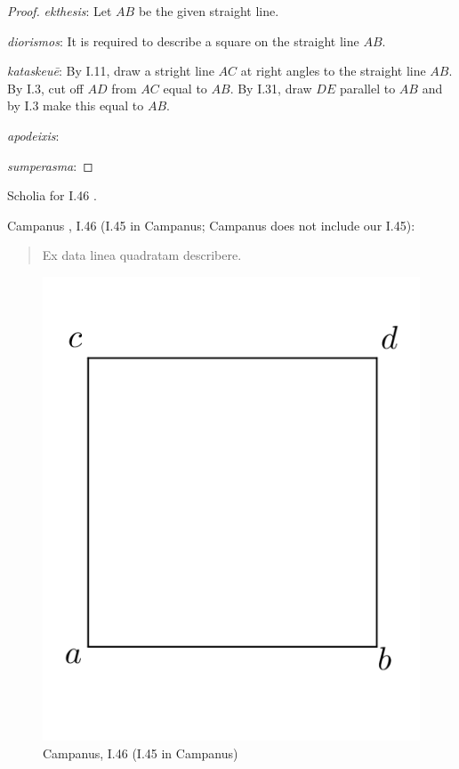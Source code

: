 \documentclass{article}
\begin{document}
\begin{proof}
{\em ekthesis}: Let $AB$ be the given straight line.

{\em diorismos}: It is required to describe a square on the straight line $AB$.

{\em kataskeu\={e}}: By I.11, draw a stright line $AC$ at right angles to the straight line $AB$.
By I.3, cut off $AD$ from $AC$ equal to $AB$.
By I.31, draw $DE$ parallel to $AB$ and by I.3 make this equal to $AB$.

{\em apodeixis}: 

{\em sumperasma}: 
\end{proof}

Scholia for I.46 \cite[pp.~209--212]{euclidisV}.

Campanus \cite[p.~92]{campanusI}, I.46 (I.45 in Campanus; Campanus does not include our I.45):

\begin{quote}
Ex data linea quadratam describere.
\end{quote}

\begin{figure}
\begin{center}
\includegraphics{campanusI45.png}
\end{center}
\caption{Campanus, I.46 (I.45 in Campanus)}
\label{campanusI45}
\end{figure}
\end{document}
